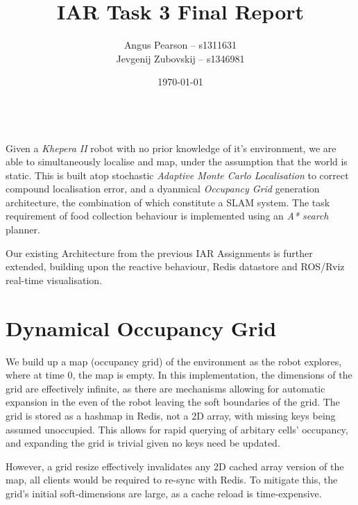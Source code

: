 \documentclass[11pt, a4paper]{article}
\renewenvironment{abstract}{%
{\mdseries\scshape\Large\abstractname}
\vspace{1em}\\
}{\par\noindent}
\begin{document}
\title{IAR Task 3 Final Report}
\author{Angus Pearson -- s1311631\\ Jevgenij Zubovskij -- s1346981}
\date{\today}
\maketitle



\begin{abstract}
Given a \textit{Khepera II} robot with no prior knowledge of it's environment, we are able to 
simultaneously localise and map, under the assumption that the world is static.
This is built atop stochastic \textit{Adaptive Monte Carlo Localisation} \cite{principlesrobot} 
to correct compound localisation error, and a dyanmical \textit{Occupancy Grid} generation architecture, 
the combination of which constitute a SLAM system. The task requirement of food collection
behaviour is implemented using an \textit{A* search} planner.

Our existing Architecture from the previous IAR Assignments \cite{task1_report}\cite{task2_report} is further
extended, building upon the reactive behaviour, Redis datastore and ROS/Rviz real-time 
visualisation.

\end{abstract}




\section{Dynamical Occupancy Grid}

We build up a map (occupancy grid) of the environment as the robot explores, where at time $0$, the map
is empty. In this implementation, the dimensions of the grid are effectively infinite, as there are
mechanisms allowing for automatic expansion in the even of the robot leaving the soft boundaries of
the grid. The grid is stored as a hashmap in Redis, not a 2D array, with missing keys being assumed 
unoccupied. This allows for rapid querying of arbitary cells' occupancy, and expanding the grid
is trivial given no keys need be updated.

However, a grid resize effectively invalidates any 2D cached array version of the map, all clients 
would be required to re-sync with Redis. To mitigate this, the grid's initial soft-dimensions
are large, as a cache reload is time-expensive.
\end{document}
